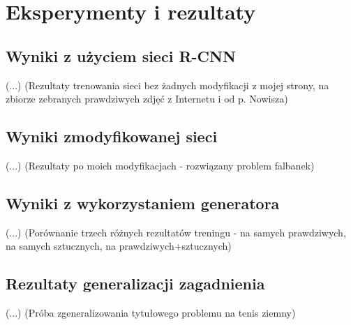 \chapter{Eksperymenty i rezultaty}

\section{Wyniki z użyciem sieci R-CNN}

(...) (Rezultaty trenowania sieci bez żadnych modyfikacji z mojej strony, na zbiorze zebranych prawdziwych zdjęć z Internetu i od p. Nowisza)

\section{Wyniki zmodyfikowanej sieci}

(...) (Rezultaty po moich modyfikacjach - rozwiązany problem falbanek)

\section{Wyniki z wykorzystaniem generatora}

(...) (Porównanie trzech różnych rezultatów treningu - na samych prawdziwych, na samych sztucznych, na prawdziwych+sztucznych)

\section{Rezultaty generalizacji zagadnienia}

(...) (Próba zgeneralizowania tytułowego problemu na tenis ziemny)
